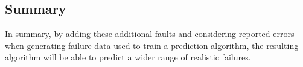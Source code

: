 \subsection{Summary} \label{sec:extSum}
In summary, by adding these additional faults and considering reported errors
when generating failure data used to train a prediction algorithm, the
resulting algorithm will be able to predict a wider range of realistic
failures.  
